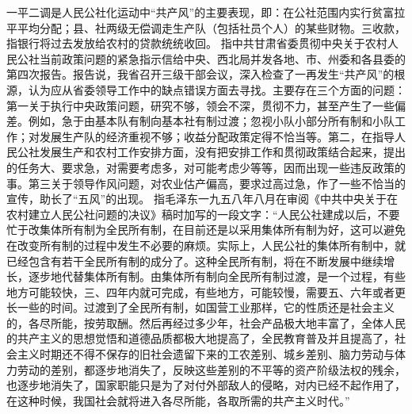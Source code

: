 \begin{maonote}
一平二调是人民公社化运动中“共产风”的主要表现，即：在公社范围内实行贫富拉平平均分配；县、社两级无偿调走生产队（包括社员个人）的某些财物。三收款，指银行将过去发放给农村的贷款统统收回。
指中共甘肃省委贯彻中央关于农村人民公社当前政策问题的紧急指示信给中央、西北局并发各地、市、州委和各县委的第四次报告。报告说，我省召开三级干部会议，深入检查了一再发生“共产风”的根源，认为应从省委领导工作中的缺点错误方面去寻找。主要存在三个方面的问题：第一关于执行中央政策问题，研究不够，领会不深，贯彻不力，甚至产生了一些偏差。例如，急于由基本队有制向基本社有制过渡；忽视小队小部分所有制和小队工作；对发展生产队的经济重视不够；收益分配政策定得不恰当等。第二，在指导人民公社发展生产和农村工作安排方面，没有把安排工作和贯彻政策结合起来，提出的任务大、要求急，对需要考虑多，对可能考虑少等等，因而出现一些违反政策的事。第三关于领导作风问题，对农业估产偏高，要求过高过急，作了一些不恰当的宣传，助长了“五风”的出现。
指毛泽东一九五八年八月在审阅《中共中央关于在农村建立人民公社问题的决议》稿时加写的一段文字：“人民公社建成以后，不要忙于改集体所有制为全民所有制，在目前还是以采用集体所有制为好，这可以避免在改变所有制的过程中发生不必要的麻烦。实际上，人民公社的集体所有制中，就已经包含有若干全民所有制的成分了。这种全民所有制，将在不断发展中继续增长，逐步地代替集体所有制。由集体所有制向全民所有制过渡，是一个过程，有些地方可能较快，三、四年内就可完成，有些地方，可能较慢，需要五、六年或者更长一些的时间。过渡到了全民所有制，如国营工业那样，它的性质还是社会主义的，各尽所能，按劳取酬。然后再经过多少年，社会产品极大地丰富了，全体人民的共产主义的思想觉悟和道德品质都极大地提高了，全民教育普及并且提高了，社会主义时期还不得不保存的旧社会遗留下来的工农差别、城乡差别、脑力劳动与体力劳动的差别，都逐步地消失了，反映这些差别的不平等的资产阶级法权的残余，也逐步地消失了，国家职能只是为了对付外部敌人的侵略，对内已经不起作用了，在这种时候，我国社会就将进入各尽所能，各取所需的共产主义时代。”
\end{maonote}
